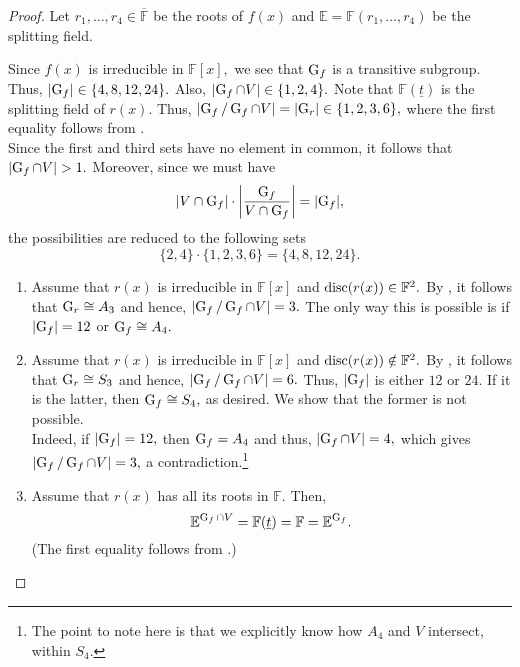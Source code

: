\classifyingirreduciblequarticgalois*\label{thm:classifyingirreduciblequarticgalois2}
\begin{flushright}\hyperref[thm:classifyingirreduciblequarticgalois]{\upsym}\end{flushright}
\begin{proof}
    Let $r_1, \ldots, r_4 \in \overline{\mathbb{F}}$ be the roots of $f(x)$ and $\mathbb{E} = \mathbb{F}(r_1, \ldots, r_4)$ be the splitting field. 

    Since $f(x)$ is irreducible in $\mathbb{F}[x],$ we see that $\operatorname{G}_f$ is a transitive subgroup. Thus, ${\left\lvert \operatorname{G}_f \right\lvert} \in \{4, 8, 12, 24\}.$ Also, ${\left\lvert \operatorname{G}_f \cap V \right\lvert} \in \{1, 2, 4\}.$ Note that $\mathbb{F}(\underline{t})$ is the splitting field of $r(x).$ Thus, ${\left\lvert \operatorname{G}_f/\operatorname{G}_f \cap V \right\lvert} = {\left\lvert \operatorname{G}_r \right\lvert} \in \{1, 2, 3, 6\},$ where the first equality follows from . \\
    Since the first and third sets have no element in common, it follows that ${\left\lvert \operatorname{G}_f \cap V \right\lvert} > 1.$ Moreover, since we must have
    \begin{equation*} 
        {\left\lvert V \cap \operatorname{G}_f \right\lvert} \cdot {\left\lvert \frac{\operatorname{G}_f}{V \cap \operatorname{G}_f} \right\lvert} = {\left\lvert \operatorname{G}_f \right\lvert},
    \end{equation*}
    the possibilities are reduced to the following sets
    \begin{equation*} 
        \{2, 4\} \cdot \{1, 2, 3, 6\} = \{4, 8, 12, 24\}.
    \end{equation*}

    \begin{enumerate}[leftmargin=*]
        \item Assume that $r(x)$ is irreducible in $\mathbb{F}[x]$ and $\operatorname{disc}(r(x)) \in \mathbb{F}^2.$ By , it follows that $\operatorname{G}_r \cong A_3$ and hence, ${\left\lvert \operatorname{G}_f/\operatorname{G}_f \cap V \right\lvert} = 3.$ The only way this is possible is if ${\left\lvert \operatorname{G}_f \right\lvert} = 12$ or $\operatorname{G}_f \cong A_4.$
        \item Assume that $r(x)$ is irreducible in $\mathbb{F}[x]$ and $\operatorname{disc}(r(x)) \notin \mathbb{F}^2.$ By , it follows that $\operatorname{G}_r \cong S_3$ and hence, ${\left\lvert \operatorname{G}_f/\operatorname{G}_f \cap V \right\lvert} = 6.$ Thus, ${\left\lvert \operatorname{G}_f \right\lvert}$ is either $12$ or $24.$ If it is the latter, then $\operatorname{G}_f \cong S_4,$ as desired. We show that the former is not possible. \\
        Indeed, if ${\left\lvert \operatorname{G}_f \right\lvert} = 12,$ then $\operatorname{G}_f = A_4$ and thus, ${\left\lvert \operatorname{G}_f \cap V \right\lvert} = 4,$ which gives ${\left\lvert \operatorname{G}_f/\operatorname{G}_f \cap V \right\lvert} = 3,$ a contradiction.\footnote{The point to note here is that we explicitly know how $A_4$ and $V$ intersect, within $S_4.$}
        \item Assume that $r(x)$ has all its roots in $\mathbb{F}.$ Then, 
        \begin{equation*} 
            \mathbb{E}^{\operatorname{G}_f \cap V} = \mathbb{F}(\underline{t}) = \mathbb{F} = \mathbb{E}^{\operatorname{G}_f}.
        \end{equation*}
        (The first equality follows from .) 


\end{enumerate}
\end{proof}
